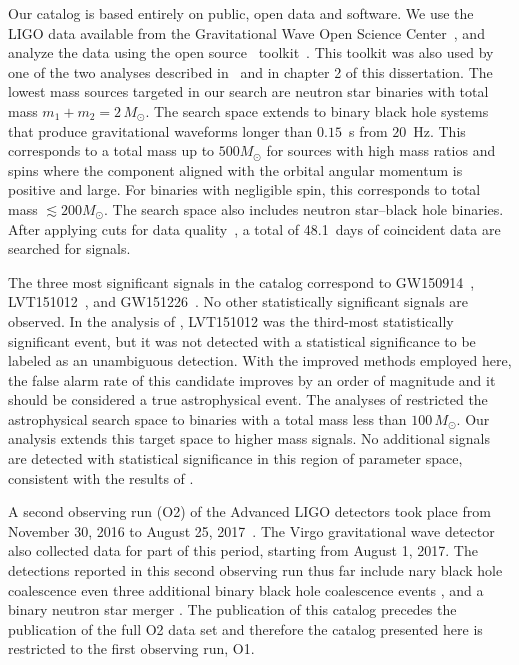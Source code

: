 Our catalog is based entirely on public, open data and software. We use the LIGO data available from the Gravitational Wave Open Science Center~\citep{Vallisneri:2014vxa}, and analyze the data using the open source \pycbc{}\ toolkit~\citep{Usman:2015kfa,Canton:2014ena,pycbc-github}. This toolkit was also used by one of the two analyses described in~\cite{TheLIGOScientific:2016qqj} and in chapter 2 of this dissertation. The lowest mass sources targeted in our search are neutron star binaries with total mass $m_1 + m_2 = 2\, M_\odot$. The search space extends to binary black hole systems that produce gravitational waveforms longer than $0.15$~s from $20$~Hz. This corresponds to a total mass up to $500 M_{\odot}$ for sources with high mass ratios and spins where the component aligned with the orbital angular momentum is positive and large. For binaries with negligible spin, this corresponds to total mass $\lesssim 200 M_{\odot}$. The search space also includes neutron star--black hole binaries. After applying cuts for data quality~\citep{TheLIGOScientific:2016zmo,TheLIGOScientific:2017lwt}, a total of 48.1~days of coincident data are searched for signals.

The three most significant signals in the catalog correspond to GW150914~\citep{Abbott:2016blz}, LVT151012~\citep{Abbott:2016blz,TheLIGOScientific:2016pea}, and GW151226~\citep{Abbott:2016nmj}. No other statistically significant signals are observed. In the analysis of \cite{TheLIGOScientific:2016pea}, LVT151012 was the third-most statistically significant event, but it was not detected with a statistical significance to be labeled as an unambiguous detection. With the improved methods employed here, the false alarm rate of this candidate improves by an order of magnitude and it should be considered a true astrophysical event. The analyses of \cite{TheLIGOScientific:2016pea,Abbott:2016ymx} restricted the astrophysical search space to binaries with a total mass less than $100\,M_\odot$. Our analysis extends this target space to higher mass signals. No additional signals are detected with statistical significance in this region of parameter space, consistent with the results of \cite{Abbott:2017iws}. 

A second observing run (O2) of the Advanced LIGO detectors took place from November 30, 2016 to August 25, 2017~\citep{Aasi:2013wya}.  The Virgo gravitational wave detector also collected data for part of this period, starting from August 1, 2017.  The detections reported in this second observing run thus far include nary black hole coalescence even three additional binary black hole coalescence events \citep{Abbott:2017vtc,Abbott:2017gyy,Abbott:2017oio}, and a binary neutron star merger \citep{TheLIGOScientific:2017qsa}. The publication of this catalog precedes the publication of the full O2 data set and therefore the catalog presented here is restricted to the first observing run, O1.


